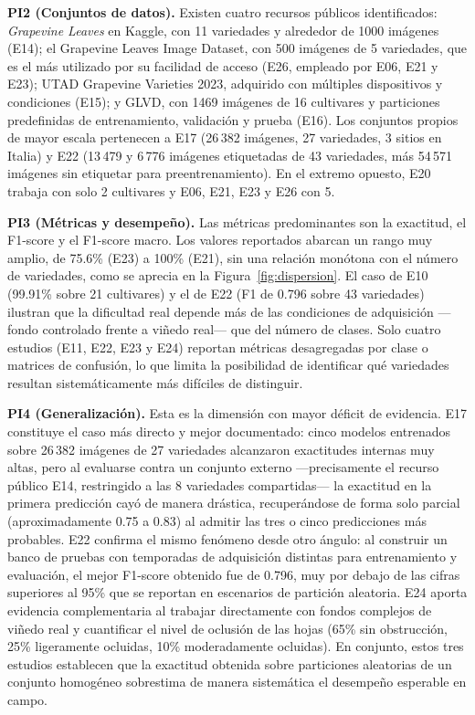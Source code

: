 \textbf{PI2 (Conjuntos de datos).} Existen cuatro recursos públicos
identificados: \textit{Grapevine Leaves} en Kaggle, con 11 variedades y
alrededor de 1000 imágenes (E14); el Grapevine Leaves Image Dataset, con 500
imágenes de 5 variedades, que es el más utilizado por su facilidad de acceso
(E26, empleado por E06, E21 y E23); UTAD Grapevine Varieties 2023, adquirido
con múltiples dispositivos y condiciones (E15); y GLVD, con 1469 imágenes de
16 cultivares y particiones predefinidas de entrenamiento, validación y
prueba (E16). Los conjuntos propios de mayor escala pertenecen a E17
(26\,382 imágenes, 27 variedades, 3 sitios en Italia) y E22 (13\,479 y 6\,776
imágenes etiquetadas de 43 variedades, más 54\,571 imágenes sin etiquetar
para preentrenamiento). En el extremo opuesto, E20 trabaja con solo 2
cultivares y E06, E21, E23 y E26 con 5.

\textbf{PI3 (Métricas y desempeño).} Las métricas predominantes son la
exactitud, el F1-score y el F1-score macro. Los valores reportados abarcan un
rango muy amplio, de 75.6\% (E23) a 100\% (E21), sin una relación monótona
con el número de variedades, como se aprecia en la
Figura~\ref{fig:dispersion}. El caso de E10 (99.91\% sobre 21 cultivares) y
el de E22 (F1 de 0.796 sobre 43 variedades) ilustran que la dificultad real
depende más de las condiciones de adquisición —fondo controlado frente a
viñedo real— que del número de clases. Solo cuatro estudios (E11, E22, E23 y
E24) reportan métricas desagregadas por clase o matrices de confusión, lo que
limita la posibilidad de identificar qué variedades resultan
sistemáticamente más difíciles de distinguir.

\textbf{PI4 (Generalización).} Esta es la dimensión con mayor déficit de
evidencia. E17 constituye el caso más directo y mejor documentado: cinco
modelos entrenados sobre 26\,382 imágenes de 27 variedades alcanzaron
exactitudes internas muy altas, pero al evaluarse contra un conjunto externo
—precisamente el recurso público E14, restringido a las 8 variedades
compartidas— la exactitud en la primera predicción cayó de manera drástica,
recuperándose de forma solo parcial (aproximadamente 0.75 a 0.83) al admitir
las tres o cinco predicciones más probables. E22 confirma el mismo fenómeno
desde otro ángulo: al construir un banco de pruebas con temporadas de
adquisición distintas para entrenamiento y evaluación, el mejor F1-score
obtenido fue de 0.796, muy por debajo de las cifras superiores al 95\% que se
reportan en escenarios de partición aleatoria. E24 aporta evidencia
complementaria al trabajar directamente con fondos complejos de viñedo real y
cuantificar el nivel de oclusión de las hojas (65\% sin obstrucción, 25\%
ligeramente ocluidas, 10\% moderadamente ocluidas). En conjunto, estos tres
estudios establecen que la exactitud obtenida sobre particiones aleatorias de
un conjunto homogéneo sobrestima de manera sistemática el desempeño esperable
en campo.

